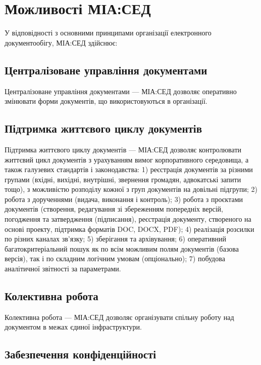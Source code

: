 \chapter{Можливості МІА:СЕД}

У відповідності з основними принципами організації електронного
документообігу, МІА:СЕД здійснює:

\section{Централізоване управління документами}

Централізоване управління документами --- МІА:СЕД дозволяє оперативно
змінювати форми документів, що використовуються в організації.

\section{Підтримка життєвого циклу документів}

Підтримка життєвого циклу документів --- МІА:СЕД дозволяє контролювати
життєвий цикл документів з урахуванням вимог корпоративного середовища, а
також галузевих стандартів і законодавства:
1) реєстрація документів за різними групами (вхідні, вихідні, внутрішні,
звернення громадян, адвокатські запити тощо), з можливістю розподілу
кожної з груп документів на довільні підгрупи;
2) робота з дорученнями (видача, виконання і контроль);
3) робота з проєктами документів (створення, редагування зі збереженням
попередніх версій, погодження та затвердження (підписання), реєстрація
документу, створеного на основі проекту, підтримка форматів DOC, DOCX,
PDF);
4) реалізація розсилки по різних каналах зв’язку;
5) зберігання та архівування;
6) оперативний багатокритеріальний пошук як по всім можливим полям
документів (базова версія), так і по складним логічним умовам
(опціонально);
7) побудова аналітичної звітності за параметрами.

\section{Колективна робота}

Колективна робота --- МІА:СЕД дозволяє організувати спільну роботу над
документом в межах єдиної інфраструктури.

\section{Забезпечення конфіденційності}

